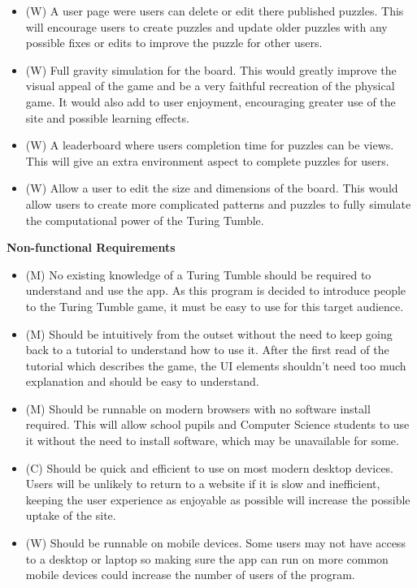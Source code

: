 \documentclass{l4proj}
\begin{document}
\begin{itemize}
    \item (W) A user page were users can delete or edit there published puzzles. This will encourage users to create puzzles and update older puzzles with any possible fixes or edits to improve the puzzle for other users.
    \item (W) Full gravity simulation for the board. This would greatly improve the visual appeal of the game and be a very faithful recreation of the physical game. It would also add to user enjoyment, encouraging greater use of the site and possible learning effects.
    \item (W) A leaderboard where users completion time for puzzles can be views. This will give an extra environment aspect to complete puzzles for users. 
    \item (W) Allow a user to edit the size and dimensions of the board. This would allow users to create more complicated patterns and puzzles to fully simulate the computational power of the Turing Tumble. 
\end{itemize}

\textbf{Non-functional Requirements}
\begin{itemize}
    \item (M) No existing knowledge of a Turing Tumble should be required to understand and use the app. As this program is decided to introduce people to the Turing Tumble game, it must be easy to use for this target audience.
    \item (M) Should be intuitively from the outset without the need to keep going back to a tutorial to understand how to use it. After the first read of the tutorial which describes the game, the UI elements shouldn't need too much explanation and should be easy to understand.
    \item (M) Should be runnable on modern browsers with no software install required. This will allow school pupils and Computer Science students to use it without the need to install software, which may be unavailable for some.
    \item (C) Should be quick and efficient to use on most modern desktop devices. Users will be unlikely to return to a website if it is slow and inefficient, keeping the user experience as enjoyable as possible will increase the possible uptake of the site.
    \item (W) Should be runnable on mobile devices. Some users may not have access to a desktop or laptop so making sure the app can run on more common mobile devices could increase the number of users of the program.
\end{itemize}
\end{document}
